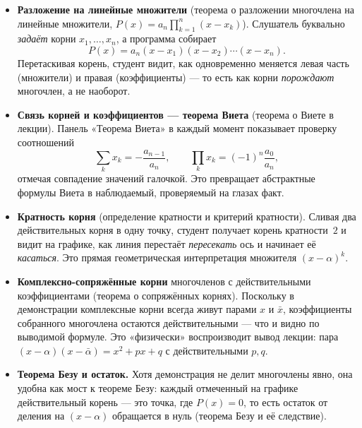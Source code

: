\begin{itemize}
  \item \textbf{Разложение на линейные множители}
    (теорема о разложении многочлена на линейные множители,
    $P(x)=a_n\prod_{k=1}^{n}(x-x_k)$). Слушатель буквально
    \emph{задаёт} корни $x_1, \dots, x_n$, а программа собирает
    \[
      P(x) = a_n (x - x_1)(x - x_2)\cdots(x - x_n).
    \]
    Перетаскивая корень, студент видит, как одновременно меняется
    левая часть (множители) и правая (коэффициенты) — то есть как
    корни \emph{порождают} многочлен, а не наоборот.

  \item \textbf{Связь корней и коэффициентов — теорема Виета}
    (теорема о Виете в лекции). Панель «Теорема Виета» в каждый момент
    показывает проверку соотношений
    \[
      \sum_{k} x_k = -\frac{a_{n-1}}{a_n}, \qquad
      \prod_{k} x_k = (-1)^n \frac{a_0}{a_n},
    \]
    отмечая совпадение значений галочкой. Это превращает абстрактные
    формулы Виета в наблюдаемый, проверяемый на глазах факт.

  \item \textbf{Кратность корня} (определение кратности и
    критерий кратности). Сливая два действительных корня в
    одну точку, студент получает корень кратности~$2$ и видит на
    графике, как линия перестаёт \emph{пересекать} ось и начинает её
    \emph{касаться}. Это прямая геометрическая интерпретация
    множителя $(x - \alpha)^k$.

  \item \textbf{Комплексно-сопряжённые корни} многочленов с
    действительными коэффициентами (теорема о сопряжённых корнях).
    Поскольку в демонстрации комплексные корни всегда живут парами
    $x$ и $\bar{x}$, коэффициенты собранного многочлена остаются
    действительными — что и видно по выводимой формуле. Это
    «физически» воспроизводит вывод лекции: пара
    $(x - \alpha)(x - \bar\alpha) = x^2 + px + q$ с действительными
    $p, q$.

  \item \textbf{Теорема Безу и остаток.} Хотя демонстрация не делит
    многочлены явно, она удобна как мост к теореме Безу: каждый
    отмеченный на графике действительный корень — это точка, где
    $P(x) = 0$, то есть остаток от деления на $(x - \alpha)$ обращается
    в нуль (теорема Безу и её следствие).
\end{itemize}

